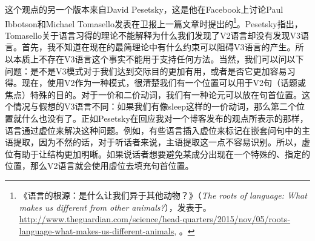 这个观点的另一个版本来自David Pesetsky，这是他在Facebook上讨论Paul Ibbotson和Michael Tomasello发表在卫报上一篇文章时提出的\footnote{%
《语言的根源：是什么让我们异于其他动物？》（\emph{The roots of language: What makes us different from other animals?}），发表于。
\url{http://www.theguardian.com/science/head-quarters/2015/nov/05/roots-language-what-makes-us-different-animals}, 。
}。Pesetsky指出，Tomasello关于语言习得的理论不能解释为什么我们发现了V2语言却没有发现V3语言。首先，我不知道在现在的最简理论中有什么约束可以阻碍V3语言的产生。所以本质上不存在V3语言这个事实不能用于支持任何方法。当然，我们可以问以下问题：是不是V3模式对于我们达到交际目的更加有用，或者是否它更加容易习得。现在，使用V2作为一种模式，很清楚我们有一个位置可以用于V2句（话题或焦点）特殊的目的。对于一价和二价动词，我们有一种论元可以放在句首位置。这个情况与假想的V3语言不同：如果我们有像sleep这样的一价动词，那么第二个位置就什么也没有了。正如Pesetsky在回应我对一个博客发布的观点所表示的那样，语言通过虚位来解决这种问题。例如，有些语言插入虚位来标记在嵌套问句中的主语提取，因为不然的话，对于听话者来说，主语提取这一点不容易识别。所以，虚位有助于让结构更加明晰。如果说话者想要避免某成分出现在一个特殊的、指定的位置，那么V2语言就会使用虚位去填充句首位置。
